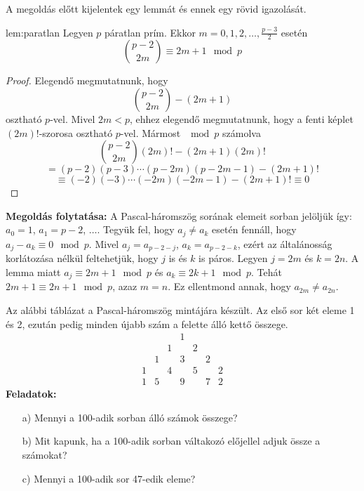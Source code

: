 \begin{solution}
A megoldás előtt kijelentek egy lemmát és ennek egy rövid igazolását.
\begin{lemma}{lem:paratlan}
Legyen $p$ páratlan prím. Ekkor $m=0,1,2,\dots,\frac{p-3}{2}$
esetén 
\[
\binom{p-2}{2m}\equiv2m+1\mod p
\]
\end{lemma}
\begin{proof}
 Elegendő megmutatnunk, hogy 
\[
\binom{p-2}{2m}-(2m+1)
\]
osztható $p$-vel. Mivel $2m<p$, ehhez elegendő megmutatnunk, hogy
a fenti képlet $(2m)!$-szorosa osztható $p$-vel. Mármost $\mod p$
számolva 
\[
\binom{p-2}{2m}(2m)!-(2m+1)(2m)!
\]
\[
=(p-2)(p-3)\cdots(p-2m)(p-2m-1)-(2m+1)!
\]
\[
\equiv(-2)(-3)\cdots(-2m)(-2m-1)-(2m+1)!\equiv0
\]
\end{proof}
 \textbf{Megoldás folytatása:} A Pascal-háromszög sorának elemeit sorban jelöljük
így: $a_{0}=1$, $a_{1}=p-2$, $\dots$. Tegyük fel, hogy $a_{j}\neq a_{k}$
esetén fennáll, hogy $a_{j}-a_{k}\equiv0\mod p$. Mivel $a_{j}=a_{p-2-j}$,
$a_{k}=a_{p-2-k}$, ezért az általánosság korlátozása nélkül feltehetjük,
hogy $j$ is és $k$ is páros. Legyen $j=2m$ és $k=2n$. A lemma
miatt $a_{j}\equiv2m+1\mod p$ és $a_{k}\equiv2k+1\mod p$. Tehát
$2m+1\equiv2n+1\mod p$, azaz $m=n$. Ez ellentmond annak, hogy $a_{2m}\neq a_{2n}$.
\end{solution}
\begin{extraproblem}
Az alábbi táblázat a Pascal-háromszög mintájára készült. Az első
sor két eleme 1 és 2, ezután pedig minden újabb szám a felette álló
kettő összege. 
\[
\begin{array}{ccccccc}
 &  &  & 1\\
 &  & 1 &  & 2\\
 & 1 &  & 3 &  & 2\\
1 &  & 4 &  & 5 &  & 2\\
1 & 5 &  & 9 &  & 7 & 2
\end{array}
\]
\textbf{Feladatok:}
\begin{enumerate}
\item[a)] Mennyi a 100-adik sorban álló számok összege? 
\item[b)] Mit kapunk, ha a 100-adik sorban váltakozó előjellel adjuk össze
a számokat? 
\item[c)] Mennyi a 100-adik sor 47-edik eleme? 
\end{enumerate}
\end{extraproblem}

